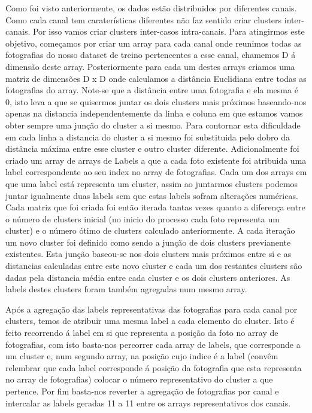 Como foi visto anteriormente, os dados estão distribuidos por diferentes canais. Como cada canal tem caraterísticas diferentes não faz sentido criar clusters inter-canais. Por isso vamos criar clusters inter-casos intra-canais.\newline
Para atingirmos este objetivo, começamos por criar um array para cada canal onde reunimos todas as fotografias do nosso dataset de treino pertencentes a esse canal, chamemos D á dimensão deste array. Posteriormente para cada um destes arrays criamos uma matriz de dimensões D x D onde calculamos a distância Euclidiana entre todas as fotografias do array. Note-se que a distância entre uma fotografia e ela mesma é 0, isto leva a que se quisermos juntar os dois clusters mais próximos baseando-nos apenas na distancia independentemente da linha e coluna em que estamos vamos obter sempre uma junção do cluster a si mesmo. Para contornar esta dificuldade em cada linha a distancia do cluster a si mesmo foi substituida pelo dobro da distância máxima entre esse cluster e outro cluster diferente. Adicionalmente foi criado um array de arrays de Labels a que a cada foto existente foi atribuida uma label correspondente ao seu index no array de fotografias. Cada um dos arrays  em que uma label está representa um cluster, assim ao juntarmos clusters podemos juntar igualmente duas labels sem que estas labels sofram alterações numéricas.\newline
Cada matriz que foi criada foi então iterada tantas vezes quanto a diferença entre o número de clusters inicial (no inicio do processo cada foto representa um cluster) e o número ótimo de clusters calculado anteriormente. \newline
A cada iteração um novo cluster foi definido como sendo a junção de dois clusters previanente existentes. Esta junção baseou-se nos dois clusters mais próximos entre si e as distancias calculadas entre este novo cluster e cada um dos restantes clusters são dadas pela distancia média entre cada cluster e os dois clusters anteriores. As labels destes clusters foram também agregadas num mesmo array.\newline
\par Após a agregação das labels representativas das fotografias para cada canal por clusters, temos de atribuir uma mesma label a cada elemento do cluster. Isto é feito recorrendo á label em si que representa a posição da foto no array de fotografias, com isto basta-nos percorrer cada array de labels, que corresponde a um cluster e, num segundo array, na posição cujo indice é a label (convêm relembrar que cada label corresponde á posição da fotografia que esta representa no array de fotografias) colocar o número representativo do cluster a que pertence.\newline
Por fim basta-nos reverter a agregação de fotografias por canal e intercalar as labels geradas 11 a 11 entre os arrays representativos dos canais.\newline


